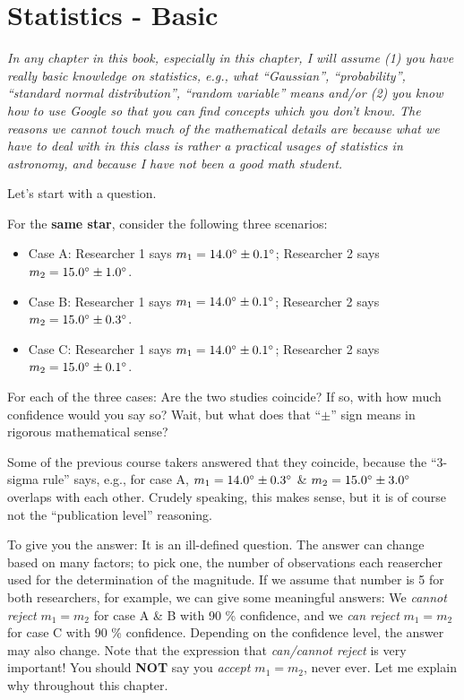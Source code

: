 \chapter{Statistics - Basic}

\textit{In any chapter in this book, especially in this chapter, I will assume (1) you have really basic knowledge on statistics, e.g., what ``Gaussian'', ``probability'', ``standard normal distribution'', ``random variable'' means and/or (2) you know how to use Google so that you can find concepts which you don't know. The reasons we cannot touch much of the mathematical details are because what we have to deal with in this class is rather a practical usages of statistics in astronomy, and because I have not been a good math student.}

Let's start with a question. 
\begin{ex}
  For the \textbf{same star}, consider the following three scenarios:
  \begin{itemize}
    \item Case A: Researcher 1 says $ m_1 =  \m{14.0} \pm \m{0.1} $; Researcher 2 says $ m_2 = \m{15.0} \pm \m{1.0} $.
    \item Case B: Researcher 1 says $ m_1 =  \m{14.0} \pm \m{0.1} $; Researcher 2 says $ m_2 = \m{15.0} \pm \m{0.3} $.
    \item Case C: Researcher 1 says $ m_1 =  \m{14.0} \pm \m{0.1} $; Researcher 2 says $ m_2 = \m{15.0} \pm \m{0.1} $.
  \end{itemize}
  For each of the three cases: Are the two studies coincide? If so, with how much confidence would you say so? Wait, but what does that ``$ \pm $'' sign means in rigorous mathematical sense?
\end{ex}

Some of the previous course takers answered that they coincide, because the ``3-sigma rule'' says, e.g., for case A, $ m_1 = \m{14.0} \pm \m{0.3} $ \& $ m_2 = \m{15.0} \pm \m{3.0} $ overlaps with each other. Crudely speaking, this makes sense, but it is of course not the ``publication level'' reasoning.

To give you the answer: It is an ill-defined question. The answer can change based on many factors; to pick one, the number of observations each reasercher used for the determination of the magnitude. If we assume that number is 5 for both researchers, for example, we can give some meaningful answers: We \textit{cannot reject} $ m_1 = m_2 $ for case A \& B with 90 \% confidence, and we \textit{can reject} $ m_1 = m_2 $ for case C with 90 \% confidence. Depending on the confidence level, the answer may also change. Note that the expression that \textit{can/cannot reject} is very important! You should \textbf{NOT} say you \textit{accept $ m_1 = m_2 $}, never ever. Let me explain why throughout this chapter.


